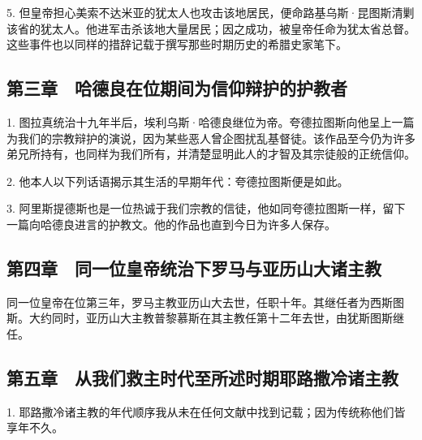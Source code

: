 5. 但皇帝担心美索不达米亚的犹太人也攻击该地居民，便命路基乌斯·昆图斯清剿该省的犹太人。他进军击杀该地大量居民；因之成功，被皇帝任命为犹太省总督。这些事件也以同样的措辞记载于撰写那些时期历史的希腊史家笔下。\par


\subsection{第三章　哈德良在位期间为信仰辩护的护教者}

1. 图拉真统治十九年半后，埃利乌斯·哈德良继位为帝。夸德拉图斯向他呈上一篇为我们的宗教辩护的演说，因为某些恶人曾企图扰乱基督徒。该作品至今仍为许多弟兄所持有，也同样为我们所有，并清楚显明此人的才智及其宗徒般的正统信仰。\par

2. 他本人以下列话语揭示其生活的早期年代：夸德拉图斯便是如此。\par

3. 阿里斯提德斯也是一位热诚于我们宗教的信徒，他如同夸德拉图斯一样，留下一篇向哈德良进言的护教文。他的作品也直到今日为许多人保存。\par


\subsection{第四章　同一位皇帝统治下罗马与亚历山大诸主教}

同一位皇帝在位第三年，罗马主教亚历山大去世，任职十年。其继任者为西斯图斯。大约同时，亚历山大主教普黎慕斯在其主教任第十二年去世，由犹斯图斯继任。\par


\subsection{第五章　从我们救主时代至所述时期耶路撒冷诸主教}

1. 耶路撒冷诸主教的年代顺序我从未在任何文献中找到记载；因为传统称他们皆享年不久。\par

